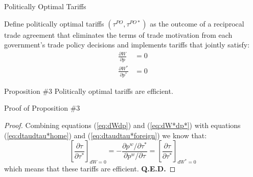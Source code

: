 \documentclass[aspectratio=169]{beamer}
\begin{document}

\begin{frame}{Politically Optimal Tariffs}

Define politically optimal tariffs $ \left( \tau^{PO}, \tau^{PO*} \right) $ as the outcome of a reciprocal trade agreement that eliminates the terms of trade motivation from each government’s trade policy decisions and implements tariffs that jointly satisfy:
\begin{align}
    \frac{\partial W}{\partial p} &= 0 \label{eq:dWdp} \\
    \frac{\partial W^{*}}{\partial p^{*}} &= 0 \label{eq:dW*dp*}
\end{align}

\begin{theorem}{Proposition \#3}
    Politically optimal tariffs are efficient.
\end{theorem}
    
\end{frame}


\begin{frame}{Proof of Proposition \#3}

\begin{proof}
    Combining equations (\ref{eq:dWdp}) and (\ref{eq:dW*dp*}) with equations (\ref{eq:dtaudtau*home}) and (\ref{eq:dtaudtau*foreign}) we know that:
    \begin{equation*}
        \left[ \frac{\partial \tau}{\partial \tau^{*}} \right]_{dW = 0} = -\frac{\partial p^{w} / \partial \tau^{*}}{\partial p^{w} / \partial \tau} = \left[ \frac{\partial \tau}{\partial \tau^{*}} \right]_{dW^{*} = 0}
    \end{equation*}
    which means that these tariffs are efficient. \textbf{Q.E.D.}
\end{proof}
    
\end{frame}

\end{document}
